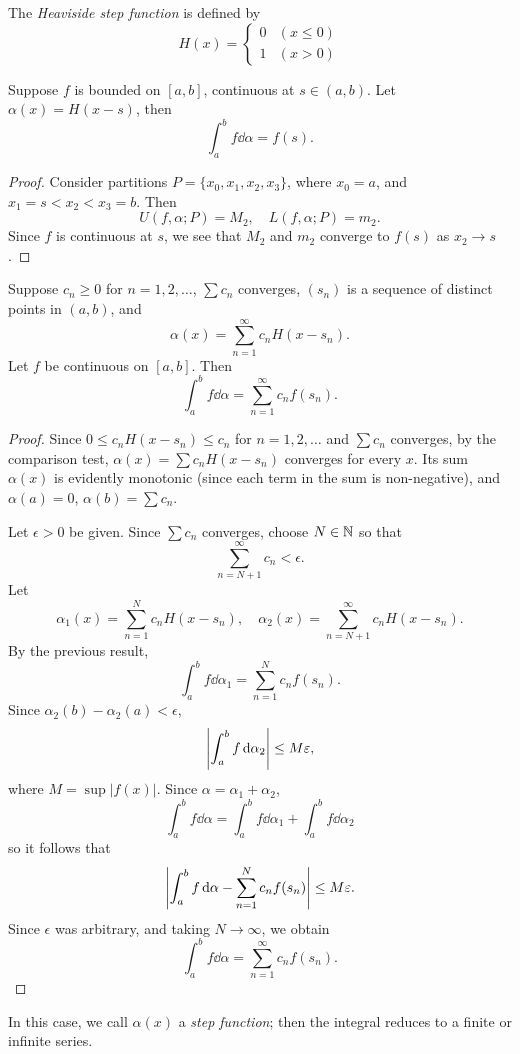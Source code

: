 \begin{example}
The \emph{Heaviside step function} is defined by
\[H(x)=\begin{cases}
0&(x\le0)\\
1&(x>0)
\end{cases}\]

\begin{proposition*}
Suppose $f$ is bounded on $[a,b]$, continuous at $s\in(a,b)$. Let $\alpha(x)=H(x-s)$, then
\[\int_a^b f\dd{\alpha}=f(s).\]
\end{proposition*}

\begin{proof}
Consider partitions $P=\{x_0,x_1,x_2,x_3\}$, where $x_0=a$, and $x_1=s<x_2<x_3=b$. Then
\[U(f,\alpha;P)=M_2,\quad L(f,\alpha;P)=m_2.\]
Since $f$ is continuous at $s$, we see that $M_2$ and $m_2$ converge to $f(s)$ as $x_2\to s$.
\end{proof}

\begin{proposition*}
Suppose $c_n\ge0$ for $n=1,2,\dots$, $\sum c_n$ converges, $(s_n)$ is a sequence of distinct points in $(a,b)$, and
\[\alpha(x)=\sum_{n=1}^{\infty}c_n H(x-s_n).\]
Let $f$ be continuous on $[a,b]$. Then
\[\int_a^b f\dd{\alpha}=\sum_{n=1}^{\infty}c_n f(s_n).\]
\end{proposition*}

\begin{proof}
Since $0\le c_n H(x-s_n)\le c_n$ for $n=1,2,\dots$ and $\sum c_n$ converges, by the comparison test, $\alpha(x)=\sum c_n H(x-s_n)$ converges for every $x$. Its sum $\alpha(x)$ is evidently monotonic (since each term in the sum is non-negative), and $\alpha(a)=0$, $\alpha(b)=\sum c_n$.

Let $\epsilon>0$ be given. Since $\sum c_n$ converges, choose $N\in\mathbb N$ so that 
\[\sum_{n=N+1}^{\infty}c_n<\epsilon.\]
Let
\[\alpha_1(x)=\sum_{n=1}^{N}c_n H(x-s_n),\quad\alpha_2(x)=\sum_{n=N+1}^{\infty}c_n H(x-s_n).\]
By the previous result,
\[\int_{a}^{b}f\dd{\alpha_1}=\sum_{n=1}^{N}c_n f(s_n).\]
Since $\alpha_2(b)-\alpha_2(a)<\epsilon$,
\[\left|\int_{a}^{b}f\dd{\alpha_2}\right|\le M\varepsilon,\]
where $M=\sup|f(x)|$. Since $\alpha=\alpha_1+\alpha_2$,
\[\int_a^b f\dd{\alpha}=\int_a^b f\dd{\alpha_1}+\int_a^bf\dd{\alpha_2}\]
so it follows that
\[\left|\int_{a}^{b}f\dd{\alpha}-\sum_{n=1}^{N}c_n f(s_n)\right|\le M\varepsilon.\]
Since $\epsilon$ was arbitrary, and taking $N\to\infty$, we obtain
\[\int_a^b f\dd{\alpha}=\sum_{n=1}^{\infty}c_n f(s_n).\]
\end{proof}
In this case, we call $\alpha(x)$ a \emph{step function}; then the integral reduces to a finite or infinite series.
\end{example}


